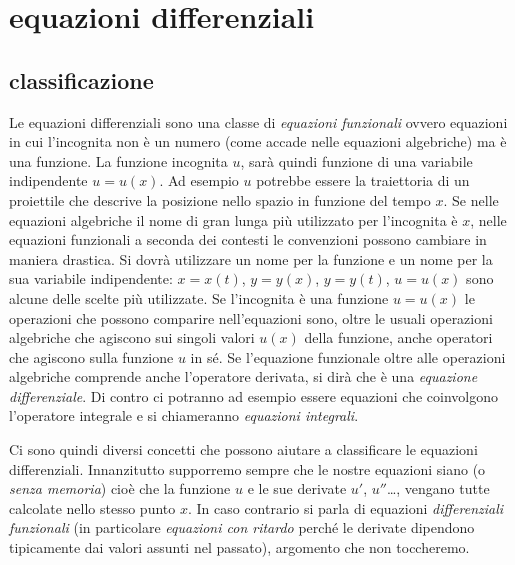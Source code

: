 \chapter{equazioni differenziali}
\label{ch:edo}

\section{classificazione}

Le equazioni differenziali sono una classe di \emph{equazioni funzionali}
ovvero
equazioni in cui l'incognita non è un numero (come accade nelle equazioni algebriche) ma è una funzione. La funzione incognita $u$, sarà quindi funzione di una variabile indipendente $u=u(x)$.
Ad esempio $u$ potrebbe essere la traiettoria di un proiettile che descrive la posizione nello spazio in funzione del tempo $x$. Se nelle equazioni algebriche il nome di gran lunga più utilizzato per l'incognita è $x$, nelle equazioni funzionali a seconda dei contesti le convenzioni possono cambiare in maniera drastica. Si dovrà utilizzare un nome per la funzione e un nome per la sua variabile indipendente: $x=x(t)$, $y=y(x)$, $y=y(t)$, $u=u(x)$ sono alcune delle scelte più utilizzate.
Se l'incognita è una funzione $u=u(x)$ le operazioni che possono comparire nell'equazioni sono,
oltre le usuali operazioni algebriche che agiscono sui singoli valori $u(x)$ della funzione,
anche operatori che agiscono sulla funzione $u$ in sé.
Se l'equazione funzionale oltre alle operazioni algebriche comprende anche
l'operatore derivata, si dirà che è una %
\emph{equazione differenziale}.
Di contro ci potranno ad esempio essere equazioni che coinvolgono l'operatore integrale e si chiameranno
\emph{equazioni integrali}.

Ci sono quindi diversi concetti che possono aiutare a classificare le equazioni differenziali.
Innanzitutto supporremo sempre che le nostre equazioni siano 
(o \emph{senza memoria})
cioè che la funzione $u$ e le sue derivate $u'$, $u''$\dots,
vengano tutte calcolate nello stesso punto $x$.
In caso contrario si parla di
equazioni \emph{differenziali funzionali} (in particolare \emph{equazioni con ritardo}
perché le derivate dipendono tipicamente dai valori assunti nel passato),
argomento che non toccheremo.

